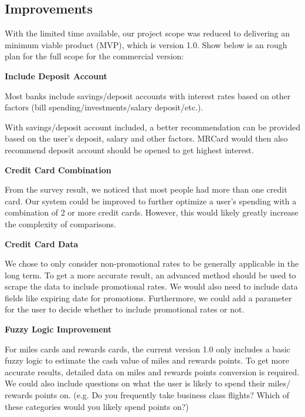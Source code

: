 \subsection{Improvements} %
\label{sub:improvements}

With the limited time available, our project scope was reduced to delivering an minimum viable product (MVP), which is version 1.0. Show below is an rough plan for the full scope for the commercial version:

\begin{description}[align=left]
	\item [version 1.1] \textbf{Include Deposit Account}

		Most banks include savings/deposit accounts with interest rates based on other factors (bill spending/investments/salary deposit/etc.).

		With savings/deposit account included, a better recommendation can be provided based on the user's deposit, salary and other factors. MRCard would then also recommend deposit account should be opened to get highest interest.


	\item [version 1.2] \textbf{Credit Card Combination}

		From the survey result, we noticed that most people had more than one credit card. Our system could be improved to further optimize a user’s spending with a combination of 2 or more credit cards. However, this would likely greatly increase the complexity of comparisons.

	\item [version 1.3] \textbf{Credit Card Data}

		We chose to only consider non-promotional rates to be generally applicable in the long term. To get a more accurate result, an advanced method should be used to scrape the data to include promotional rates. We would also need to include  data fields like expiring date for promotions. Furthermore, we could add a parameter for the user to decide whether to include promotional rates or not.

	\item [version 1.4] \textbf{Fuzzy Logic Improvement}

		For miles cards and rewards cards, the current version 1.0 only includes a basic fuzzy logic to estimate the cash value of miles and rewards points. To get more accurate results, detailed data on miles and rewards points conversion is required. We could also include questions on what the user is likely to spend their miles/ rewards points on. (e.g. Do you frequently take business class flights? Which of these categories would you likely spend points on?)

\end{description}

